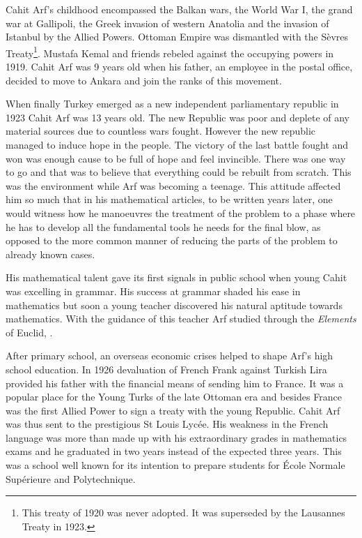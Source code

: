 \documentclass[12pt]{amsart}
\begin{document}
Cahit Arf's childhood encompassed the Balkan wars, the  World War I, the grand war at Gallipoli, the Greek invasion of western Anatolia and the invasion of Istanbul by the Allied Powers. Ottoman Empire was dismantled with the S\`{e}vres Treaty\footnote{This treaty of 1920 was never adopted. It was superseded by the Lausannes Treaty in 1923.}. Mustafa Kemal and friends rebeled against the occupying powers in 1919. Cahit Arf was 9 years old when his father, an employee in the postal office, decided to move to Ankara and join the ranks of this movement.

When finally Turkey emerged as a new independent parliamentary republic in 1923 Cahit Arf was 13 years old.  The new Republic was poor and deplete of any material sources due to countless wars fought. However the new republic managed to induce hope in the people. The victory of the last battle fought and won was enough cause to be full of hope and feel invincible.  There was one way to go and that was to believe that everything could be rebuilt from scratch.  This was the environment while Arf was becoming a teenage. This attitude affected him so much that in his mathematical articles, to be written years later, one would witness how he manoeuvres the treatment of the problem to a phase where he has to develop all the fundamental tools he needs for the final blow, as opposed to the more common manner of reducing the parts of the problem to already known cases.

His mathematical talent gave its first signals in public school when young Cahit was excelling in grammar. His success at grammar shaded his ease in mathematics but soon a young teacher discovered his natural aptitude towards mathematics.  With the guidance of this teacher Arf  studied  through the \emph{Elements} of Euclid, \cite{CA}.

After primary school, an overseas economic crises helped to shape Arf's high school education.
In 1926 devaluation of French Frank against Turkish Lira provided his father with the financial means of sending him to France. It was a popular place for the Young Turks of the late Ottoman era and besides France was the first Allied Power to sign a treaty with the young Republic. Cahit Arf was thus sent to the prestigious St Louis Lyc\'{e}e. His weakness in the French language was more than made up with his extraordinary grades in mathematics exams and he graduated in two years instead of the expected three years. This was a school well known for its intention to prepare students for \'{E}cole Normale Sup\'{e}rieure and Polytechnique.
\end{document}
